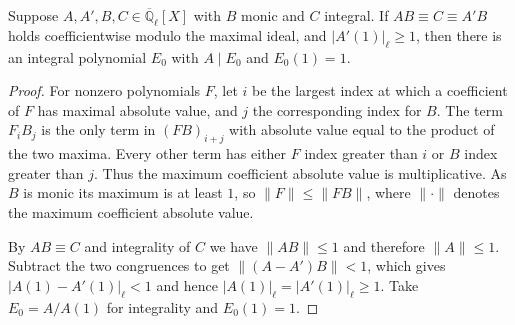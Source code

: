 \begin{lemma}
\label{lem:c-hecke-chain-integral-normalization}
\emitthmsource
Suppose $A,A',B,C\in\overline{\mathbb Q}_\ell[X]$ with $B$ monic and $C$ integral. If $AB\equiv C\equiv A'B$ holds coefficientwise modulo the maximal ideal, and $|A'(1)|_\ell\ge1$, then there is an integral polynomial $E_0$ with $A\mid E_0$ and $E_0(1)=1$.
\end{lemma}
\begin{proof}
For nonzero polynomials $F$, let $i$ be the largest index at which a coefficient of $F$ has maximal absolute value, and $j$ the corresponding index for $B$. The term $F_i B_j$ is the only term in $(FB)_{i+j}$ with absolute value equal to the product of the two maxima. Every other term has either $F$ index greater than $i$ or $B$ index greater than $j$. Thus the maximum coefficient absolute value is multiplicative. As $B$ is monic its maximum is at least $1$, so $\|F\|\le\|FB\|$, where $\|\cdot\|$ denotes the maximum coefficient absolute value.

By $AB\equiv C$ and integrality of $C$ we have $\|AB\|\le1$ and therefore $\|A\|\le1$. Subtract the two congruences to get $\|(A-A')B\|<1$, which gives $|A(1)-A'(1)|_\ell<1$ and hence $|A(1)|_\ell=|A'(1)|_\ell\ge1$. Take $E_0=A/A(1)$ for integrality and $E_0(1)=1$.
\end{proof}

